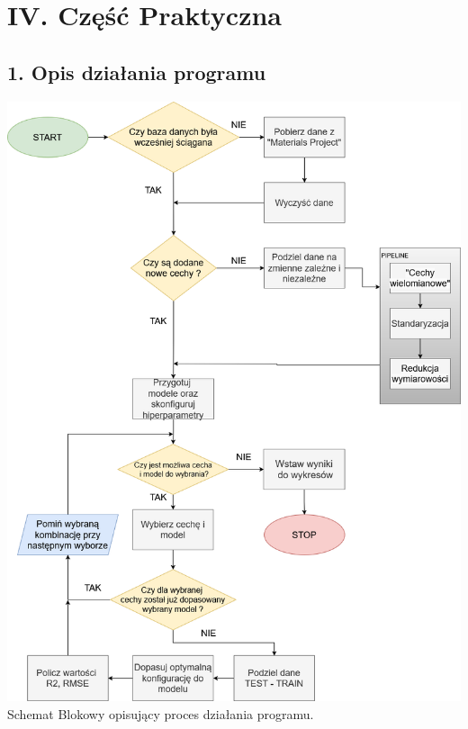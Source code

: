 {}
\justify
\fontsize{14}{16}\selectfont
\setlength{\parindent}{0pt}
\chapter*{IV. Część Praktyczna } 
\fontsize{12}{14}\selectfont

{}
\justify
\fontsize{14}{16}\selectfont
\setlength{\parindent}{0pt}
\section*{1. Opis działania programu} 
\fontsize{12}{14}\selectfont


\includegraphics[width=\textwidth]{images/get df.drawio.png}
Schemat Blokowy opisujący proces działania programu.

\clearpage
